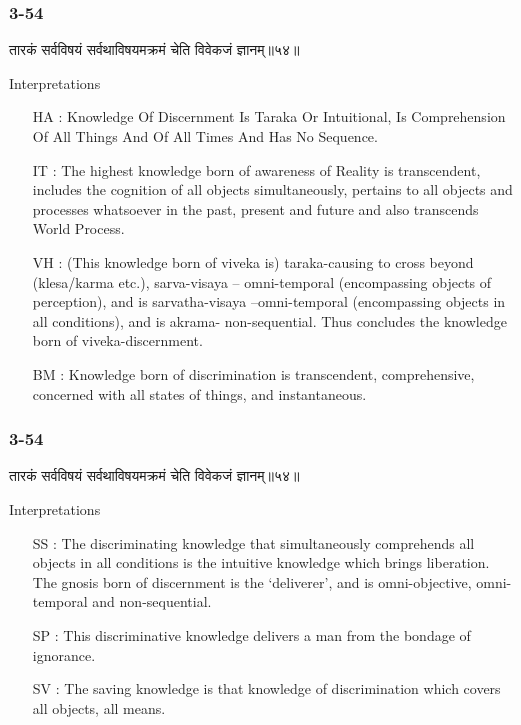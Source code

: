 \begin{frame}[fragile]\frametitle{3-54}
\begin{sanskrit}
तारकं सर्वविषयं सर्वथाविषयमक्रमं चेति विवेकजं ज्ञानम्॥५४॥
\end{sanskrit}

Interpretations
\begin{itemize}	
\item [HA]: Knowledge Of Discernment Is Taraka Or Intuitional, Is Comprehension Of All Things And Of All Times And Has No Sequence.
\item [IT]: The highest knowledge born of awareness of Reality is transcendent, includes the cognition of all objects simultaneously, pertains to all objects and processes whatsoever in the past, present and future and also transcends World Process.		
\item [VH]: (This knowledge born of viveka is) taraka-causing to cross beyond (klesa/karma etc.), sarva-visaya – omni-temporal (encompassing objects of perception), and is sarvatha-visaya –omni-temporal (encompassing objects in all conditions), and is akrama- non-sequential. Thus concludes the knowledge born of viveka-discernment.
\item [BM]: Knowledge born of discrimination is transcendent, comprehensive, concerned with all states of things, and instantaneous.
\end{itemize}
\end{frame}

\begin{frame}[fragile]\frametitle{3-54}
\begin{sanskrit}
तारकं सर्वविषयं सर्वथाविषयमक्रमं चेति विवेकजं ज्ञानम्॥५४॥
\end{sanskrit}

Interpretations
\begin{itemize}	
\item [SS]: The discriminating knowledge that simultaneously comprehends all objects in all conditions is the intuitive knowledge which brings liberation. The gnosis born of discernment is the ‘deliverer’, and is omni-objective, omni-temporal and non-sequential.
\item [SP]: This discriminative knowledge delivers a man from the bondage of ignorance.
\item [SV]: The saving knowledge is that knowledge of discrimination which covers all objects, all means. 
\end{itemize}
\end{frame}


